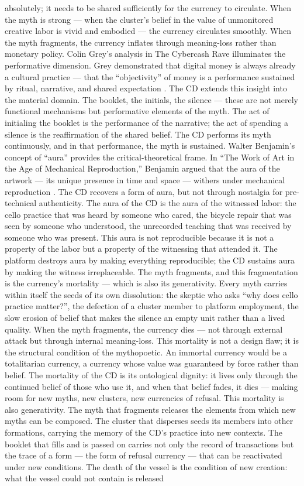 absolutely; it needs to be shared sufficiently for the currency to circulate. When the myth is strong — when the cluster’s belief in the value of unmonitored creative labor is vivid and embodied — the currency circulates smoothly. When the myth fragments, the currency inflates through meaning-loss rather than monetary policy. Colin Grey’s analysis in The Cybercash Rave illuminates the performative dimension. Grey demonstrated that digital money is always already a cultural practice — that the “objectivity” of money is a performance sustained by ritual, narrative, and shared expectation \cite{grey_2004}. The CD extends this insight into the material domain. The booklet, the initials, the silence — these are not merely functional mechanisms but performative elements of the myth. The act of initialing the booklet is the performance of the narrative; the act of spending a silence is the reaffirmation of the shared belief. The CD performs its myth continuously, and in that performance, the myth is sustained. Walter Benjamin’s concept of “aura” provides the critical-theoretical frame. In “The Work of Art in the Age of Mechanical Reproduction,” Benjamin argued that the aura of the artwork — its unique presence in time and space — withers under mechanical reproduction \cite{benjamin_1968}. The CD recovers a form of aura, but not through nostalgia for pre-technical authenticity. The aura of the CD is the aura of the witnessed labor: the cello practice that was heard by someone who cared, the bicycle repair that was seen by someone who understood, the unrecorded teaching that was received by someone who was present. This aura is not reproducible because it is not a property of the labor but a property of the witnessing that attended it. The platform destroys aura by making everything reproducible; the CD sustains aura by making the witness irreplaceable. The myth fragments, and this fragmentation is the currency’s mortality — which is also its generativity. Every myth carries within itself the seeds of its own dissolution: the skeptic who asks “why does cello practice matter?”, the defection of a cluster member to platform employment, the slow erosion of belief that makes the silence an empty unit rather than a lived quality. When the myth fragments, the currency dies — not through external attack but through internal meaning-loss. This mortality is not a design flaw; it is the structural condition of the mythopoetic. An immortal currency would be a totalitarian currency, a currency whose value was guaranteed by force rather than belief. The mortality of the CD is its ontological dignity: it lives only through the continued belief of those who use it, and when that belief fades, it dies — making room for new myths, new clusters, new currencies of refusal. This mortality is also generativity. The myth that fragments releases the elements from which new myths can be composed. The cluster that disperses seeds its members into other formations, carrying the memory of the CD’s practice into new contexts. The booklet that fills and is passed on carries not only the record of transactions but the trace of a form — the form of refusal currency — that can be reactivated under new conditions. The death of the vessel is the condition of new creation: what the vessel could not contain is released 
